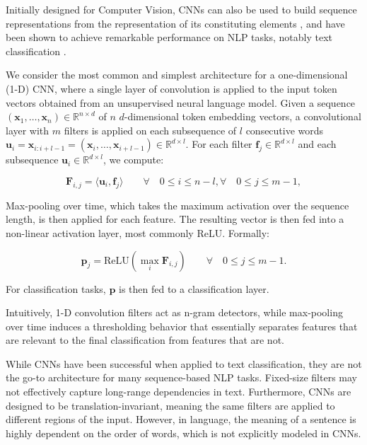 Initially designed for Computer Vision, \acp{CNN} can also be used to build sequence representations from the representation of its constituting elements \citep{collobert2008unified, kim2014convolutional}, and have been shown to achieve remarkable performance on \ac{NLP} tasks, notably text classification \citep{duque2019squeezed, wang2015semantic, liu2020multichannel}. 

We consider the most common and simplest architecture for a one-dimensional (1-D) \ac{CNN}, where a single layer of convolution is applied to the input token vectors obtained from an unsupervised neural language model. Given a sequence $(\bm{x}_1, \ldots, \bm{x}_n) \in \mathbb{R}^{n \times d}$ of $n$ $d$-dimensional token embedding vectors, a convolutional layer with $m$ filters is applied on each subsequence of $l$ consecutive words $\bm{u}_i = \bm{x}_{i:i+l-1} = (\bm{x}_i, \ldots, \bm{x}_{i+l-1}) \in \mathbb{R}^{d \times l}$. For each filter $\bm{f}_j \in \mathbb{R}^{d \times l}$ and each subsequence $\bm{u}_i \in \mathbb{R}^{d \times l}$, we compute:

\begin{equation}
\bm{F}_{i,j} = \langle \bm{u}_i, \bm{f}_j\rangle \qquad \forall \quad 0 \leq i \leq n-l, \forall \quad 0 \leq j \leq m-1,
\end{equation}

Max-pooling over time, which takes the maximum activation over the sequence length, is then applied for each feature. The resulting vector is then fed into a non-linear activation layer, most commonly ReLU. Formally:

\begin{equation}
    \bm{p}_j = \mathrm{ReLU}(\max_{i}\bm{F}_{i,j}) \qquad \forall \quad 0 \leq j \leq m-1.
\end{equation}

For classification tasks, $\bm{p}$ is then fed to a classification layer.

Intuitively, 1-D convolution filters act as n-gram detectors, while max-pooling over time induces a thresholding behavior that essentially separates features that are relevant to the final classification from features that are not.

While \acp{CNN} have been successful when applied to text classification, they are not the go-to architecture for many sequence-based \ac{NLP} tasks. Fixed-size filters may not effectively capture long-range dependencies in text. Furthermore, \acp{CNN} are designed to be translation-invariant, meaning the same filters are applied to different regions of the input. However, in language, the meaning of a sentence is highly dependent on the order of words, which is not explicitly modeled in \acp{CNN}. 

